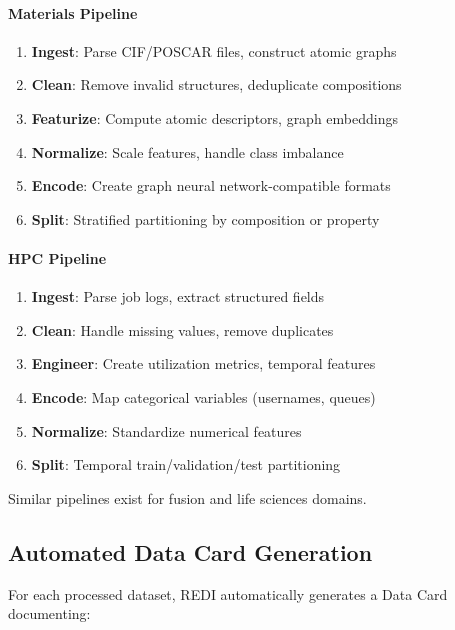 \documentclass[11pt,letterpaper,twocolumn]{article}
\begin{document}
\paragraph{Materials Pipeline}
\begin{enumerate}
    \item \textbf{Ingest}: Parse CIF/POSCAR files, construct atomic graphs
    \item \textbf{Clean}: Remove invalid structures, deduplicate compositions
    \item \textbf{Featurize}: Compute atomic descriptors, graph embeddings
    \item \textbf{Normalize}: Scale features, handle class imbalance
    \item \textbf{Encode}: Create graph neural network-compatible formats
    \item \textbf{Split}: Stratified partitioning by composition or property
\end{enumerate}

\paragraph{HPC Pipeline}
\begin{enumerate}
    \item \textbf{Ingest}: Parse job logs, extract structured fields
    \item \textbf{Clean}: Handle missing values, remove duplicates
    \item \textbf{Engineer}: Create utilization metrics, temporal features
    \item \textbf{Encode}: Map categorical variables (usernames, queues)
    \item \textbf{Normalize}: Standardize numerical features
    \item \textbf{Split}: Temporal train/validation/test partitioning
\end{enumerate}

Similar pipelines exist for fusion and life sciences domains.

\subsection{Automated Data Card Generation}

For each processed dataset, REDI automatically generates a Data Card documenting:
\end{document}
